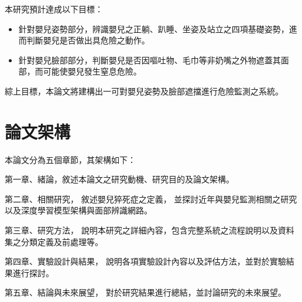 \documentclass[class=NCU_thesis, crop=false]{standalone}
\begin{document}
本研究預計達成以下目標：
\begin{itemize}
    \item 針對嬰兒姿勢部分，辨識嬰兒之正躺、趴睡、坐姿及站立之四項基礎姿勢，進而判斷嬰兒是否做出具危險之動作。
    \item 針對嬰兒臉部部分，判斷嬰兒是否因嘔吐物、毛巾等非奶嘴之外物遮蓋其面部，而可能使嬰兒發生窒息危險。
\end{itemize}

綜上目標，本論文將建構出一可對嬰兒姿勢及臉部遮擋進行危險監測之系統。

\section{論文架構}
本論文分為五個章節，其架構如下：

第一章、緒論，敘述本論文之研究動機、研究目的及論文架構。

第二章、相關研究，
敘述嬰兒猝死症之定義，
並探討近年與嬰兒監測相關之研究以及深度學習模型架構與面部辨識網路。

第三章、研究方法，
說明本研究之詳細內容，包含完整系統之流程說明以及資料集之分類定義及前處理等。

第四章、實驗設計與結果，
說明各項實驗設計內容以及評估方法，並對於實驗結果進行探討。

第五章、結論與未來展望，
對於研究結果進行總結，並討論研究的未來展望。
\end{document}
